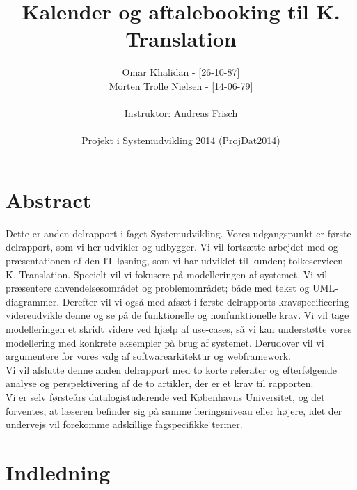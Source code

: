 \documentclass[12pt]{article}   %
\title{Kalender og aftalebooking til K. Translation}
\author{Omar Khalidan - [26-10-87]\\
     Morten Trolle Nielsen - [14-06-79]\\ \\
    Instruktor: Andreas Frisch\\ \\
Projekt i Systemudvikling 2014 (ProjDat2014)}
\begin{document}
\maketitle
\thispagestyle{empty}
\newpage
\tableofcontents
\newpage

\section{Abstract}
Dette er anden delrapport i faget Systemudvikling. Vores udgangspunkt er første
delrapport, som vi her udvikler og udbygger. Vi vil fortsætte arbejdet med og
præsentationen af den IT-løsning, som vi har udviklet til kunden; tolkeservicen
K. Translation. Specielt vil vi fokusere på modelleringen af systemet. Vi vil 
præsentere anvendelsesområdet og problemområdet; både med tekst og UML-diagrammer.
Derefter vil vi også med afsæt i første delrapports kravspecificering videreudvikle
denne og se på de funktionelle og nonfunktionelle krav. Vi vil tage modelleringen
et skridt videre ved hjælp af use-cases, så vi kan understøtte vores modellering med
konkrete eksempler på brug af systemet. Derudover vil vi argumentere for vores
valg af softwarearkitektur og webframework. \\
Vi vil afslutte denne anden delrapport med to korte referater og efterfølgende
analyse og perspektivering af de to artikler, der er et krav til rapporten.\\
Vi er selv førsteårs datalogistuderende ved Københavns Universitet, og det
forventes, at læseren befinder sig på samme læringsniveau eller højere, idet
der undervejs vil forekomme adskillige fagspecifikke termer. 

\newpage

\section{Indledning}
\end{document}
